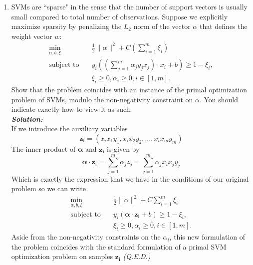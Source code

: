 \documentclass{article}
\begin{document}
\begin{enumerate}
\item SVMs are ``sparse" in the sense that the number of support vectors is usually small compared to total number of observations. Suppose we explicitly maximize sparsity by penalizing the $L_2$ norm of the vector $\alpha$ that defines the weight vector $w$:
\begin{align*}
\min_{\alpha,b,\xi} \quad &\frac{1}{2} \parallel \alpha \parallel^2+ 
C\left(\sum_{i=1}^m \xi_i\right)\\
\text{subject to}\quad & y_i \left(\left(\sum_{j=1}^m \alpha_j y_j x_j\right)\cdot x_i + b\right) \geq 1-\xi_i, \\ 
& \xi_i\geq0, \alpha_i \geq 0, i\in [1,m].
\end{align*}
Show that the problem coincides with an instance of the primal optimization problem of SVMs, modulo the non-negativity constraint on $\alpha$. You should indicate exactly how to view it as such.\\
\textbf{\emph{Solution:}}\\
If we introduce the auxiliary variables
\begin{equation*}
    \bm{z_i} = (x_ix_1y_1, x_ix_2y_2, \ldots, x_ix_my_m)
\end{equation*}
The inner product of $\bm{\alpha}$ and $\bm{z_i}$ is given by
\begin{equation*}
    \bm{\alpha} \cdot \bm{z_i} = \sum_{j=1}^m \alpha_j z_j = \sum_{j=1}^m \alpha_j x_ix_jy_j
\end{equation*}
Which is exactly the expression that we have in the conditions of our original problem so we can write
\begin{align*}
\min_{\alpha,b,\xi} \quad &\frac{1}{2} \parallel \alpha \parallel^2 + C \sum_{i=1}^m \xi_i \\
\text{subject to}\quad & y_i \left(\bm{\alpha} \cdot \bm{z_i} + b\right) \geq 1-\xi_i, \\ 
& \xi_i\geq0, \alpha_i \geq 0, i\in [1,m].
\end{align*}
Aside from the non-negativity constraints on the $\alpha_i$, this new formulation of the problem coincides with the standard formulation of a primal SVM optimization problem on samples $\bm{z_i}$ \emph{(Q.E.D.)}
\end{enumerate}
\end{document}
